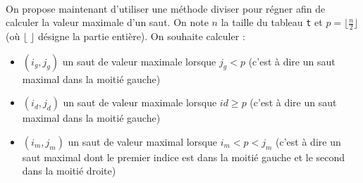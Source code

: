 \documentclass[11pt,a4paper]{article}
\begin{document}
\begin{Exercise}[title={Saut de valeur maximale}, origin={\bac {\sc capes nsi 2023}}]
  \ExePart[name = {Résolution avec une méthode diviser pour régner}]\\
	On propose maintenant d'utiliser une méthode diviser pour régner afin de calculer la valeur maximale d'un saut. On note $n$ la taille du tableau {\tt t} et $p = \lfloor \frac{n}{2} \rfloor$ (où $\lfloor \; \rfloor$ désigne la partie entière). On souhaite calculer :
	\begin{itemize}
		\item $(i_g,j_g)$ un saut de valeur maximale lorsque $j_g < p$ (c'est à dire un saut maximal dans la moitié gauche)
		\item $(i_d,j_d)$ un saut de valeur maximale lorsque $id \geqslant p$ (c'est à dire un saut maximal dans la moitié gauche)
		\item $(i_m,j_m)$ un saut de valeur maximal lorsque $i_m < p < j_m$ (c'est à dire un saut maximal dont le premier indice est dans la moitié gauche et le second dans la moitié droite)
	\end{itemize}


\end{Exercise}
\end{document}
